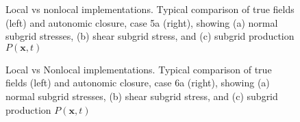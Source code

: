 %
\begin{figure}
	\centering %
	\label{F:NG2a}
\end{figure}
%
\begin{figure}
	\ContinuedFloat
	\centering %
	\label{F:NG2b}
\end{figure}
%
\begin{figure}
	\ContinuedFloat
	\centering %
	\label{F:NG2c}
\end{figure}
%
\begin{figure}
	\ContinuedFloat
	\caption{Local vs nonlocal implementations. Typical comparison of  true fields (left) and autonomic closure, case 5a (right), showing (a) normal subgrid stresses, (b) shear subgrid stress, and (c) subgrid production $P(\mathbf{x},t)$}
	\label{F:NG2}
\end{figure}
%
%

%
\begin{figure}
	\centering %
	\label{F:CG24a}
\end{figure}
%
\begin{figure}
	\ContinuedFloat
	\centering %
	\label{F:CG24b}
\end{figure}
%
\begin{figure}
	\ContinuedFloat
	\centering %
	\label{F:CG24c}
\end{figure}
%
\begin{figure}
	\ContinuedFloat
	\caption{Local vs Nonlocal implementations. Typical comparison of  true fields (left) and autonomic closure, case 6a (right), showing (a) normal subgrid stresses, (b) shear subgrid stress, and (c) subgrid production $P(\mathbf{x},t)$}
	\label{F:CG24}
\end{figure}
%
%



